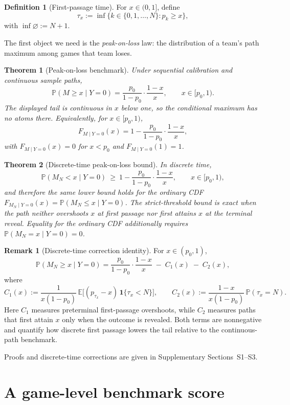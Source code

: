 \documentclass[12pt,letterpaper]{article}  %
\newcommand{\E}{\mathbb{E}}
\renewcommand{\P}{\mathbb{P}}
\theoremstyle{plain}
\newtheorem{theorem}{Theorem}
\theoremstyle{definition}
\newtheorem{definition}{Definition}
\newtheorem{remark}{Remark}
\begin{document}
\begin{definition}[First-passage time]
For $x\in(0,1]$, define
\[
\tau_x := \inf\{k\in\{0,1,\dots,N\}: p_k\ge x\},
\]
with $\inf\varnothing := N+1$.
\end{definition}

The first object we need is the \emph{peak-on-loss} law: the distribution of a team's path maximum among games that team loses.

\begin{theorem}[Peak-on-loss benchmark] \label{thm:continuous-conditional}
Under sequential calibration and continuous sample paths,
\[
\P(M\ge x \mid Y=0)=\frac{p_0}{1-p_0}\cdot\frac{1-x}{x},
\qquad x\in[p_0,1).
\]
The displayed tail is continuous in $x$ below one, so the conditional maximum has no atoms there.
Equivalently, for $x\in[p_0,1)$,
\[
F_{M\mid Y=0}(x)=1-\frac{p_0}{1-p_0}\cdot\frac{1-x}{x},
\]
with $F_{M\mid Y=0}(x)=0$ for $x<p_0$ and $F_{M\mid Y=0}(1)=1$.
\end{theorem}

\begin{theorem}[Discrete-time peak-on-loss bound] \label{thm:discrete-conditional}
In discrete time,
\[
\P(M_N<x\mid Y=0)\ \ge\ 1-\frac{p_0}{1-p_0}\cdot\frac{1-x}{x},
\qquad x\in[p_0,1),
\]
and therefore the same lower bound holds for the ordinary CDF $F_{M_N\mid Y=0}(x)=\P(M_N\le x\mid Y=0)$.
The strict-threshold bound is exact when the path neither overshoots $x$ at first passage nor first attains $x$ at the terminal reveal. Equality for the ordinary CDF additionally requires \(\P(M_N=x\mid Y=0)=0\).
\end{theorem}

\begin{remark}[Discrete-time correction identity] \label{rem:discrete-correction}
For $x\in(p_0,1)$,
\[
\P(M_N\ge x\mid Y=0)
=\frac{p_0}{1-p_0}\cdot\frac{1-x}{x}\;-\;C_1(x)\;-\;C_2(x),
\]
where
\[
C_1(x):=\frac{1}{x(1-p_0)}\,\E\!\big[(p_{\tau_x}-x)\,\mathbf 1\{\tau_x< N\}\big],
\qquad
C_2(x):=\frac{1-x}{x(1-p_0)}\,\P(\tau_x=N).
\]
Here $C_1$ measures preterminal first-passage overshoots, while $C_2$ measures paths that first attain $x$ only when the outcome is revealed.
Both terms are nonnegative and quantify how discrete first passage lowers the tail relative to the continuous-path benchmark.
\end{remark}

Proofs and discrete-time corrections are given in Supplementary Sections~S1--S3.

\section{A game-level benchmark score} \label{sec:applications}
\end{document}
